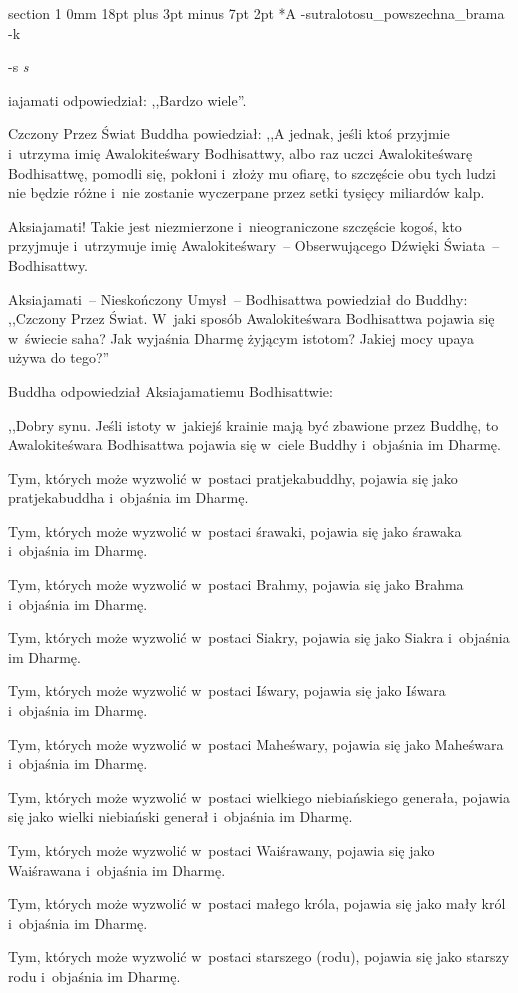 \documentclass[12pt]{article}
\makeatletter
\renewcommand{\section}{\@startsection%
 {section}			%
 {1}				%
 {0mm}				%
 {18pt plus 3pt minus 7pt}	%
 { 2pt}				%
 {\bfseries}}			%
\newcounter{labelnum}
\newenvironment{Prayer}[4]{%
	\section*{#2}
	\ifx -#1
		\stepcounter{labelnum}\label{label.\arabic{labelnum}}\nopagebreak
	\else
		\label{#1}\nopagebreak
	\fi
	\ifx -#3
		\addcontentsline{toc}{section}{#2}
	\else
		\addcontentsline{toc}{section}{#3}
	\fi
	\ifx -#4
		{}
	\else
		\noindent\emph{#4}\par\nopagebreak
	\fi
	\begingroup
}
{\par\endgroup}
\makeatother
\begin{document}
\begin{Prayer}{sutralotosu_powszechna_brama}
Aksiajamati odpowiedział: ,,Bardzo wiele''.


Czczony Przez Świat Buddha powiedział: ,,A jednak, jeśli ktoś przyjmie
i~utrzyma imię Awalokiteśwary Bodhisattwy, albo raz uczci Awalokiteśwarę
Bodhisattwę, pomodli się, pokłoni i~złoży mu ofiarę, to szczęście obu tych
ludzi nie będzie różne i~nie zostanie wyczerpane przez setki tysięcy miliardów
kalp.


Aksiajamati! Takie jest niezmierzone i~nieograniczone szczęście kogoś, kto
przyjmuje i~utrzymuje imię Awalokiteśwary~-- Obserwującego Dźwięki Świata~--
Bodhisattwy.


Aksiajamati~-- Nieskończony Umysł~-- Bodhisattwa powiedział do Buddhy:
,,Czczony Przez Świat. W~jaki sposób Awalokiteśwara Bodhisattwa pojawia się
w~świecie saha? Jak wyjaśnia Dharmę żyjącym istotom? Jakiej mocy upaya używa do
tego?''


Buddha odpowiedział Aksiajamatiemu Bodhisattwie:


,,Dobry synu. Jeśli istoty w~jakiejś krainie mają być zbawione przez Buddhę, to
Awalokiteśwara Bodhisattwa pojawia się w~ciele Buddhy i~objaśnia im Dharmę.


Tym, których może wyzwolić w~postaci pratjekabuddhy, pojawia się jako
pratjekabuddha i~objaśnia im Dharmę.


Tym, których może wyzwolić w~postaci śrawaki, pojawia się jako śrawaka
i~objaśnia im Dharmę.


Tym, których może wyzwolić w~postaci Brahmy, pojawia się jako Brahma i~objaśnia
im Dharmę.


Tym, których może wyzwolić w~postaci Siakry, pojawia się jako Siakra i~objaśnia
im Dharmę.


Tym, których może wyzwolić w~postaci Iśwary, pojawia się jako Iśwara i~objaśnia
im Dharmę.


Tym, których może wyzwolić w~postaci Maheśwary, pojawia się jako Maheśwara
i~objaśnia im Dharmę.


Tym, których może wyzwolić w~postaci wielkiego niebiańskiego generała, pojawia
się jako wielki niebiański generał i~objaśnia im Dharmę.


Tym, których może wyzwolić w~postaci Waiśrawany, pojawia się jako Waiśrawana
i~objaśnia im Dharmę.


Tym, których może wyzwolić w~postaci małego króla, pojawia się jako mały król
i~objaśnia im Dharmę.


Tym, których może wyzwolić w~postaci starszego (rodu), pojawia się jako starszy
rodu i~objaśnia im Dharmę.



\end{Prayer}
\end{document}
